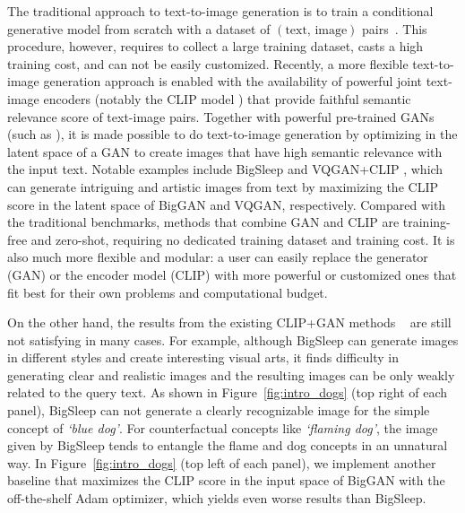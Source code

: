 \documentclass[10pt,twocolumn,letterpaper]{article}
\newcommand{\ganclip}{CLIP+GAN}
\begin{document}
The traditional approach to text-to-image generation is to train 
a conditional generative model from scratch with 
a dataset of $(\text{text, image})$ pairs~\cite{mansimov2015generating, reed2016generative, xu2018attngan, li2019object, tao2020df, ramesh2021zero}. 
This procedure, however, requires to collect a large training dataset, casts a high training cost, and can not be easily customized. 
Recently,
a more flexible text-to-image generation approach is enabled 
with the availability of powerful joint text-image encoders (notably the CLIP model \cite{radford2021learning}) that provide 
faithful semantic relevance score of text-image pairs.
Together with powerful pre-trained GANs (such as  \cite{abdal2019image2stylegan, brock2018large, li2019object, zhu2019dm}),
it is made possible to do text-to-image generation 
by optimizing in the latent space of a GAN to create images 
that have high semantic relevance with the input text. 
Notable examples include BigSleep \cite{bigsleep}
and VQGAN+CLIP \cite{VQGANCLIP}, which can generate intriguing and artistic images  
from text by maximizing the CLIP score in the latent space of BigGAN and VQGAN, respectively. Compared with the traditional benchmarks, 
methods that combine 
GAN and CLIP are training-free and zero-shot, 
requiring no dedicated training dataset and training cost.  
It is also much more flexible and modular: 
a user can easily replace the generator (GAN) or the encoder model (CLIP)
with more powerful or customized ones 
that fit best for their own problems and computational budget. 


On the other hand, the results from 
the existing {\ganclip} methods ~\cite{bigsleep, galatolo2021generating, VQGANCLIP}
are still not satisfying in many cases.   
For example, although BigSleep can generate 
images in different styles and create interesting visual arts, 
it finds difficulty in generating clear and realistic images and the resulting images can be only weakly related to the query text.
As shown in Figure~\ref{fig:intro_dogs} (top right of each panel),   
BigSleep can not generate a clearly recognizable image
for the simple concept of \emph{`blue dog'}.
For counterfactual concepts like \emph{`flaming dog'}, 
the image given by BigSleep tends to entangle the flame and dog concepts in an unnatural way. 
In Figure~\ref{fig:intro_dogs} (top left of each panel),
we  implement another baseline that  maximizes the CLIP score 
in the input space of BigGAN \cite{brock2018large} with the off-the-shelf Adam \cite{kingma2015adam} optimizer, which yields even worse results than BigSleep. 
\end{document}
